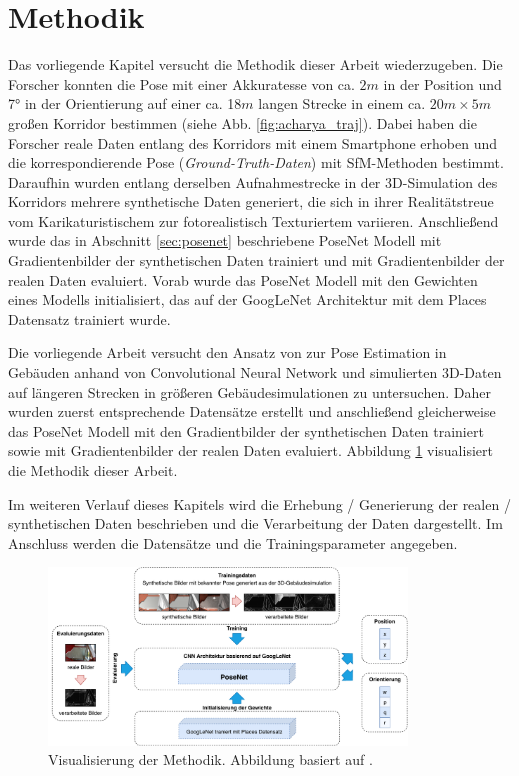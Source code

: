 
\section{Methodik}

Das vorliegende Kapitel versucht die Methodik dieser Arbeit wiederzugeben. Die Forscher \citet{acharyaBIMPoseNetIndoorCamera2019} konnten die Pose mit einer Akkuratesse von ca. $2m$ in der Position und 7° in der Orientierung auf einer ca. 18$m$ langen Strecke in einem ca. $20m \times 5m$ großen Korridor bestimmen (siehe Abb. \ref{fig:acharya_traj}). Dabei haben die Forscher reale Daten entlang des Korridors mit einem Smartphone erhoben und die korrespondierende Pose (\textit{Ground-Truth-Daten}) mit SfM-Methoden bestimmt. Daraufhin wurden entlang derselben Aufnahmestrecke in der 3D-Simulation des Korridors mehrere synthetische Daten generiert, die sich in ihrer Realitätstreue vom Karikaturistischem zur fotorealistisch Texturiertem variieren. Anschließend wurde das in Abschnitt \ref{sec:posenet} beschriebene PoseNet Modell mit Gradientenbilder der synthetischen Daten trainiert und mit Gradientenbilder der realen Daten evaluiert. Vorab wurde das PoseNet Modell mit den Gewichten eines Modells initialisiert, das auf der GoogLeNet Architektur mit dem Places Datensatz \cite{zhouLearningDeepFeatures2014} trainiert wurde. 

Die vorliegende Arbeit versucht den Ansatz von \citet{acharyaBIMPoseNetIndoorCamera2019} zur Pose Estimation in Gebäuden anhand von Convolutional Neural Network und simulierten 3D-Daten auf längeren Strecken in größeren Gebäudesimulationen zu untersuchen. Daher wurden zuerst entsprechende Datensätze erstellt und anschließend gleicherweise das PoseNet Modell mit den Gradientbilder der synthetischen Daten trainiert sowie mit Gradientenbilder der realen Daten evaluiert. Abbildung \ref{fig:methodik} visualisiert die Methodik dieser Arbeit.


Im weiteren Verlauf dieses Kapitels wird die Erhebung / Generierung der realen / synthetischen Daten beschrieben und die Verarbeitung der Daten dargestellt. Im Anschluss werden die Datensätze und die Trainingsparameter angegeben. 


\begin{figure}
	\centering
	\includegraphics[width=0.85\textwidth]{images/methodik/methodik.pdf}
	\caption{Visualisierung der Methodik. Abbildung basiert auf \cite{acharyaBIMPoseNetIndoorCamera2019}.}
	\label{fig:methodik}
\end{figure}


